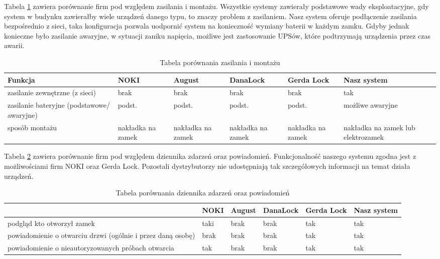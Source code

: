  	\newpage
 	Tabela \ref{tab:porownanie2} zawiera porównanie firm pod względem zasilania i montażu. Wszystkie systemy zawierały podstawowe wady eksploatacyjne, gdy system w budynku zawierałby wiele urządzeń danego typu, to znaczy problem z zasilaniem. Nasz system oferuje podłączenie zasilania bezpośrednio z sieci, taka konfiguracja pozwala uodpornić system na konieczność wymiany baterii w każdym zamku. Gdyby jednak konieczne było zasilanie awaryjne, w sytuacji zaniku napięcia, możliwe jest zastosowanie UPSów, które podtrzymają urządzenia przez czas awarii.
 \begin{longtable}[!ht]{|m{2.9cm}|m{1.3cm}|m{1.3cm}|m{}|m{}|m{}|} 
 	\caption{Tabela porównania zasilania i montażu}
 	\label{tab:porownanie2}\\
 	\hline	
 	Funkcja & NOKI & August &DanaLock & Gerda Lock & Nasz \linebreak system \\	\hline
 	zasilanie zewnętrzne (z sieci)	
 	& brak & brak & brak & brak & tak \\	\hline
	 zasilanie bateryjne (podstawowe/ awaryjne)	
	 & podst. & podst. &podst. & podst. & możliwe awaryjne \\	\hline
 	sposób montażu	
 	& nakładka na \linebreak zamek & nakładka na \linebreak zamek & nakładka na \linebreak zamek & nakładka na \linebreak zamek & nakładka na \linebreak zamek lub elektrozamek  \\	\hline
 \end{longtable}
 
Tabela \ref{tab:porownanie3} zawiera porównanie firm pod względem dziennika zdarzeń oraz powiadomień. Funkcjonalność naszego systemu zgodna jest z możliwościami firm NOKI oraz Gerda Lock. Pozostali dystrybutorzy nie udostępniają tak szczegółowych informacji na temat działa urządzeń.
\begin{longtable}[!ht]{|m{4cm}|m{1cm}|m{1cm}|m{}|m{1cm}|m{}|} 
	\caption{Tabela porównania dziennika zdarzeń oraz powiadomień}
	\label{tab:porownanie3}\\
	\hline	
	& NOKI & August & DanaLock & Gerda Lock & Nasz system \\	\hline
	podgląd kto otworzył zamek
	& taki & brak & brak & tak & tak \\	\hline
	powiadomienie o otwarciu drzwi (ogólnie i przez daną osobę)
	& brak & brak & brak & tak & tak  \\	\hline
	powiadomienie o nieautoryzowanych próbach otwarcia
	& tak & brak & brak & tak & tak  \\	\hline
\end{longtable}

